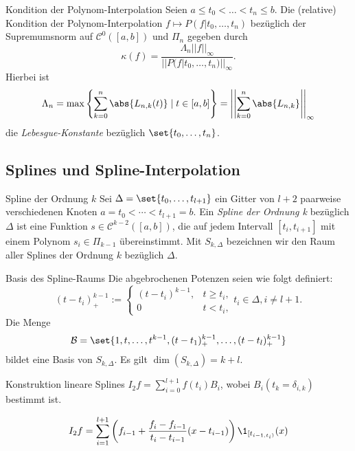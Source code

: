 \begin{karte}{Kondition der Polynom-Interpolation}
	Seien \( a \leq t_0 < \ldots < t_n \leq b \). Die (relative) Kondition 
	der Polynom-Interpolation \( f \mapsto P(f|t_0,\ldots, t_n) \) bezüglich der 
	Supremumsnorm auf \( \mathcal{C}^0([a,b]) \) und \( \Pi_n \) gegeben durch 
	\[ \kappa(f) = \frac{ \Lambda_n ||f||_\infty }{ || P(f|t_0,\ldots, t_n) ||_\infty }. \]
	Hierbei ist 
	\[ \Lambda_n = \max\left\{ \sum_{k=0}^n \abs{L_{n,k}(t)} \;|\; t\in [a,b] \right\}
	= \left|\left| \sum_{k=0}^n \abs{L_{n,k}} \right|\right|_\infty \]
	die \textit{Lebesgue-Konstante} bezüglich \( \set{t_0, \ldots, t_n} \).
\end{karte}

\subsection*{Splines und Spline-Interpolation}

\begin{karte}{Spline der Ordnung \(k\)}
	Sei \( \Delta = \set{t_0, \ldots, t_{l+1}} \) ein Gitter von \( l+2 \) 
	paarweise verschiedenen Knoten \( a = t_0 < \cdots < t_{l+1} = b \). 
	Ein \textit{Spline der Ordnung k} bezüglich \( \Delta \) ist eine Funktion 
	\( s \in \mathcal{C}^{k-2}([a,b]) \), die auf jedem Intervall \( [t_i, t_{i+1}] \) 
	mit einem Polynom \( s_i \in \Pi_{k-1} \) übereinstimmt. Mit \( S_{k, \Delta} \) 
	bezeichnen wir den Raum aller Splines der Ordnung \( k \) bezüglich \( \Delta \).
\end{karte}

\begin{karte}{Basis des Spline-Raums}
	Die abgebrochenen Potenzen seien wie folgt definiert:
	\[ (t - t_i)_+^{k-1} := \begin{cases}
		(t - t_i)^{k-1}, & t \geq t_i, \\
		0 & t < t_i, 
	\end{cases} t_i \in \Delta, i \neq l + 1. \]
	Die Menge 
	\[ \mathcal{B} = \set{ 1, t, \ldots, t^{k-1}, (t - t_1)_+^{k-1}, \ldots, (t - t_l)_+^{k-1}} \]
	bildet eine Basis von \( S_{k, \Delta} \). Es gilt \( \dim(S_{k,\Delta}) = k+l \).
\end{karte}

\begin{karte}{Konstruktion lineare Splines}
	\( I_2f = \sum_{i=0}^{l+1} f(t_i) B_i \), wobei \( B_i(t_k = \delta_{i,k}) \) bestimmt ist.

	\[ I_2f = \sum_{i=1}^{l+1} \left(f_{i-1} + \frac{f_i - f_{i-1}}{t_i - t_{i-1}}(x - t_{i-1}) \right)\1_{[t_{i-1,t_i)}}(x) \]
\end{karte}

